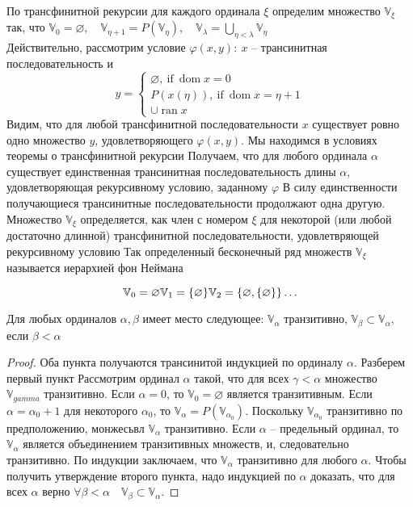\begin{theo}
По трансфинитной рекурсии для каждого ординала $\xi$ определим множество $\mathbb{V}_{\xi}$ так, что $\mathbb{V}_0 = \varnothing,\quad \mathbb{V}_{\eta + 1} = P(\mathbb{V}_{\eta}),\quad \mathbb{V}_{\lambda} = \bigcup_{\eta < \lambda}\mathbb{V}_{\eta}$\\
Действительно, рассмотрим условие $\varphi(x,y):\ x$ -- трансинитная последовательность и
$$
y =
\begin{cases}
	\varnothing,\ \text{if}\ \operatorname{dom} x = 0\\
	P(x(\eta)),\ \text{if}\ \operatorname{dom} x = \eta + 1\\
	\cup \operatorname{ran} x
\end{cases}
$$
Видим, что для любой трансфинитной последовательности $x$ существует ровно одно множество $y$, удовлетворяющего $\varphi(x,y)$. Мы находимся в условиях теоремы о трансфинитной рекурсии
\vskip 0.1in
Получаем, что для любого ординала $\alpha$ существует единственная трансинитная последовательность длины $\alpha$, удовлетворяющая рекурсивному условию, заданному $\varphi$
\vskip 0.1in
В силу единственности получающиеся трансинитные последовательности продолжают одна другую.
\vskip 0.1in
Множество $\mathbb{V}_{\xi}$ определяется, как член с номером $\xi$ для некоторой (или любой достаточно длинной) трансфинитной последовательности, удовлетвряющей рекурсивному условию
\vskip 0.1in
Так определенный бесконечный ряд множеств $\mathbb{V}_{\xi}$ называется иерархией фон Неймана
\end{theo}

$$
\mathbb{V}_0 = \varnothing\\
\mathbb{V}_1 = \{\varnothing\}\\
\mathbb{V}_2 = \{\varnothing, \{\varnothing\}\}\\
\ldots
$$

\begin{lem}
Для любых ординалов $\alpha, \beta$ имеет место следующее: $\mathbb{V}_{\alpha}$ транзитивно, $\mathbb{V}_{\beta} \subset \mathbb{V}_{\alpha}$, если $\beta < \alpha$
\end{lem}
\begin{proof}
Оба пункта получаются трансинитой индукцией по ординалу $\alpha$. Разберем первый пункт
\vskip 0.1in
Рассмотрим ординал $\alpha$ такой, что для всех $\gamma < \alpha$ множество $\mathbb{V}_{gamma}$ транзитивно. Если $\alpha = 0$, то $\mathbb{V}_{0} = \varnothing$ является транзитивным.
\vskip 0.1in
Если $\alpha = \alpha_0 + 1$ для некоторого $\alpha_0$, то $\mathbb{V}_{\alpha} = P(\mathbb{V}_{\alpha_0})$. Поскольку $\mathbb{V}_{\alpha_0}$ транзитивно по предположению, монжесьвл $\mathbb{V}_{\alpha}$ транзитивно.
\vskip 0.1in
Если $\alpha$ -- предельный ординал, то $\mathbb{V}_{\alpha}$ является объединением транзитивных множеств, и, следовательно транзитивно.
\vskip 0.1in
По индукции заключаем, что $\mathbb{V}_{\alpha}$ транзитивно для любого $\alpha$.
\vskip 0.1in
Чтобы получить утверждение второго пункта, надо индукцией по $\alpha$ доказать, что для всех $\alpha$ верно $\forall \beta < \alpha\quad \mathbb{V}_{\beta} \subset \mathbb{V}_{\alpha}$.
\end{proof}

